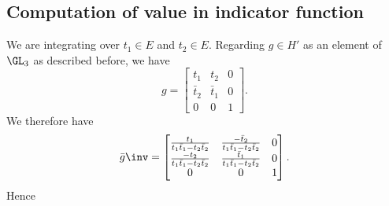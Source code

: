 \subsection{Computation of value in indicator function}
We are integrating over $t_1 \in E$ and $t_2 \in E$.
Regarding $g \in H'$ as an element of $\GL_3$ as described before, we have
\[ g = \begin{bmatrix}
  t_1 & t_2 & 0  \\
  \bar t_2 & \bar t_1 & 0 \\
  0 & 0 & 1
  \end{bmatrix}. \]
We therefore have
\[ \bar g \inv = \begin{bmatrix}
  \frac{t_1}{t_1 \bar t_1 - t_2 \bar t_2} & \frac{-\bar t_2}{t_1 \bar t_1 - t_2 \bar t_2} & 0 \\
  \frac{-t_2}{t_1 \bar t_1 - t_2 \bar t_2} & \frac{\bar t_1}{t_1 \bar t_1 - t_2 \bar t_2} & 0 \\
  0 & 0 & 1 \end{bmatrix}. \]
Hence

